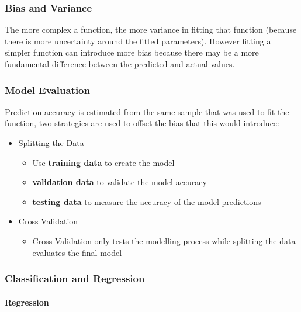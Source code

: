 \documentclass[]{book}
\providecommand{\tightlist}{%
  \setlength{\itemsep}{0pt}\setlength{\parskip}{0pt}}
\let\oldparagraph\paragraph
\renewcommand{\paragraph}[1]{\oldparagraph{#1}\mbox{}}
\begin{document}
\subsubsection{Bias and Variance}\label{bias-and-variance}

The more complex a function, the more variance in fitting that function
(because there is more uncertainty around the fitted parameters).
However fitting a simpler function can introduce more bias because there
may be a more fundamental difference between the predicted and actual
values.

\subsubsection{Model Evaluation}\label{model-evaluation}

Prediction accuracy is estimated from the same sample that was used to
fit the function, two strategies are used to offset the bias that this
would introduce:

\begin{itemize}
\tightlist
\item
  Splitting the Data

  \begin{itemize}
  \tightlist
  \item
    Use \textbf{training data} to create the model
  \item
    \textbf{validation data} to validate the model accuracy
  \item
    \textbf{testing data} to measure the accuracy of the model
    predictions
  \end{itemize}
\item
  Cross Validation

  \begin{itemize}
  \tightlist
  \item
    Cross Validation only tests the modelling process while splitting
    the data evaluates the final model
  \end{itemize}
\end{itemize}

\subsubsection{Classification and
Regression}\label{classification-and-regression}

\paragraph{Regression}\label{regression}
\end{document}
